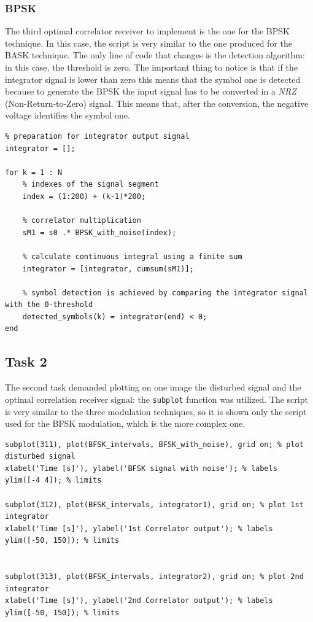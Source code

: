 \subsubsection*{BPSK}
The third optimal correlator receiver to implement is the one for the BPSK technique. In this case, the script is very similar to the one produced for the BASK technique. The only line of code that changes is the detection algorithm: in this case, the threshold is zero. The important thing to notice is that if the integrator signal is lower than zero this means that the symbol one is detected because to generate the BPSK the input signal has to be converted in a \textsl{NRZ} (Non-Return-to-Zero) signal. This means that, after the conversion, the negative voltage identifies the symbol one.

\begin{lstlisting}
% preparation for integrator output signal 
integrator = [];    

for k = 1 : N
    % indexes of the signal segment
    index = (1:200) + (k-1)*200;

    % correlator multiplication 
    sM1 = s0 .* BPSK_with_noise(index);  

    % calculate continuous integral using a finite sum
    integrator = [integrator, cumsum(sM1)]; 

    % symbol detection is achieved by comparing the integrator signal with the 0-threshold
    detected_symbols(k) = integrator(end) < 0;
end
\end{lstlisting}

\subsection*{Task 2}
The second task demanded plotting on one image the disturbed signal and the optimal correlation receiver signal: the \texttt{subplot} function was utilized. The script is very similar to the three modulation techniques, so it is shown only the script used for the BFSK modulation, which is the more complex one.

\begin{lstlisting}
subplot(311), plot(BFSK_intervals, BFSK_with_noise), grid on; % plot disturbed signal
xlabel('Time [s]'), ylabel('BFSK signal with noise'); % labels
ylim([-4 4]); % limits

subplot(312), plot(BFSK_intervals, integrator1), grid on; % plot 1st integrator
xlabel('Time [s]'), ylabel('1st Correlator output'); % labels
ylim([-50, 150]); % limits


subplot(313), plot(BFSK_intervals, integrator2), grid on; % plot 2nd integrator
xlabel('Time [s]'), ylabel('2nd Correlator output'); % labels
ylim([-50, 150]); % limits
\end{lstlisting}

